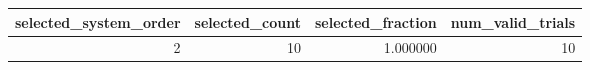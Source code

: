 \begin{tabular}{rrrr}
\toprule
selected_system_order & selected_count & selected_fraction & num_valid_trials \\
\midrule
2 & 10 & 1.000000 & 10 \\
\bottomrule
\end{tabular}
